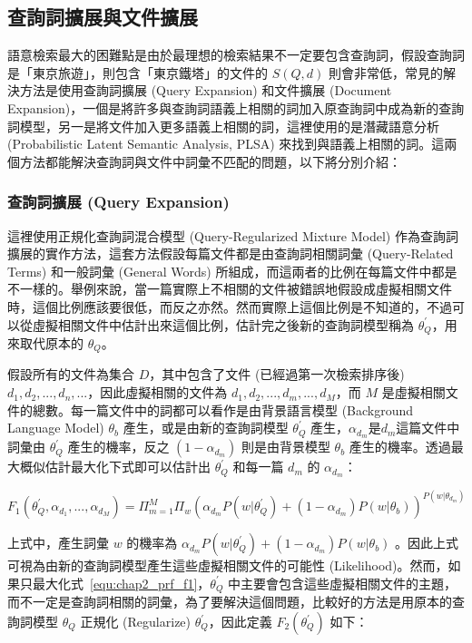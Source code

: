 \subsection{查詢詞擴展與文件擴展}
\label{sec:query_doc_exp}
語意檢索最大的困難點是由於最理想的檢索結果不一定要包含查詢詞，假設查詢詞是「東京旅遊」，則包含「東京鐵塔」的文件的 $S(Q, d)$ 則會非常低，常見的解決方法是使用查詢詞擴展 (Query Expansion) 和文件擴展 (Document Expansion)，一個是將許多與查詢詞語義上相關的詞加入原查詢詞中成為新的查詢詞模型，另一是將文件加入更多語義上相關的詞，這裡使用的是潛藏語意分析 (Probabilistic Latent Semantic Analysis, PLSA) 來找到與語義上相關的詞。這兩個方法都能解決查詢詞與文件中詞彙不匹配的問題，以下將分別介紹：

\subsubsection{查詢詞擴展 (Query Expansion)}
\label{sec:prf}
這裡使用正規化查詢詞混合模型 (Query-Regularized Mixture Model) 作為查詢詞擴展的實作方法，這套方法假設每篇文件都是由查詢詞相關詞彙 (Query-Related Terms) 和一般詞彙 (General Words)
所組成，而這兩者的比例在每篇文件中都是不一樣的。舉例來說，當一篇實際上不相關的文件被錯誤地假設成虛擬相關文件時，這個比例應該要很低，而反之亦然。然而實際上這個比例是不知道的，不過可以從虛擬相關文件中估計出來這個比例，估計完之後新的查詢詞模型稱為 $\theta_Q^{'}$，用來取代原本的 $\theta_Q$。

假設所有的文件為集合 $D$，其中包含了文件 (已經過第一次檢索排序後) ${d_1, d_2, ..., d_n, ...}$，因此虛擬相關的文件為 ${d_1, d_2, ..., d_m, ..., d_M}$，而 $M$ 是虛擬相關文件的總數。每一篇文件中的詞都可以看作是由背景語言模型 (Background Language Model) $\theta_b$ 產生，或是由新的查詢詞模型 $\theta_Q^{'}$ 產生，$\alpha_{d_m}$是$d_m$這篇文件中詞彙由 $\theta_Q^{'}$ 產生的機率，反之 $(1-\alpha_{d_m})$ 則是由背景模型 $\theta_b$ 產生的機率。透過最大概似估計最大化下式即可以估計出
$\theta_Q^{'}$ 和每一篇 $d_m$ 的 $\alpha_{d_m}$：

\begin{equation}
\label{equ:chap2_prf_f1}
F_1(\theta_Q^{'}, \alpha_{d_1}, ..., \alpha_{d_M}) = \Pi^M_{m=1} \Pi_w (\alpha_{d_m} P(w|\theta_Q^{'}) + (1 - \alpha_{d_m}) P(w|\theta_b))^{P(w|\theta_{d_m})}
\end{equation}

上式中，產生詞彙 $w$ 的機率為 $\alpha_{d_m} P(w|\theta_Q^{'}) + (1-\alpha_{d_m}) P(w|\theta_b)$ 。因此上式可視為由新的查詢詞模型產生這些虛擬相關文件的可能性 (Likelihood)。然而，如果只最大化式~\ref{equ:chap2_prf_f1}，$\theta_Q^{'}$ 中主要會包含這些虛擬相關文件的主題，而不一定是查詢詞相關的詞彙，為了要解決這個問題，比較好的方法是用原本的查詢詞模型 $\theta_Q$ 正規化 (Regularize) $\theta_Q^{'}$，因此定義 $F_2(\theta_Q^{'})$ 如下：

